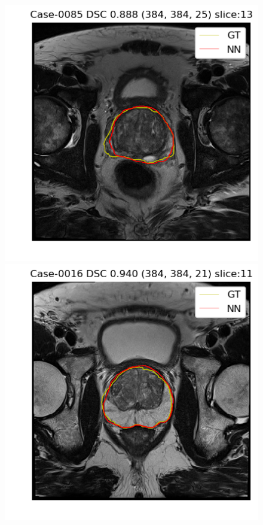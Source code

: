 \begin{figure}[h]
    \includegraphics[totalheight=.2\textheight]{imgs/results/Prostate_Px_Challenge__P_yes_Original_MEAN_Case-0085.png}
    \includegraphics[totalheight=.2\textheight]{imgs/results/Prostate_Px_Challenge__P_yes_Original_MAX_Case-0016.png}
    \vspace{10mm}

\end{figure}
